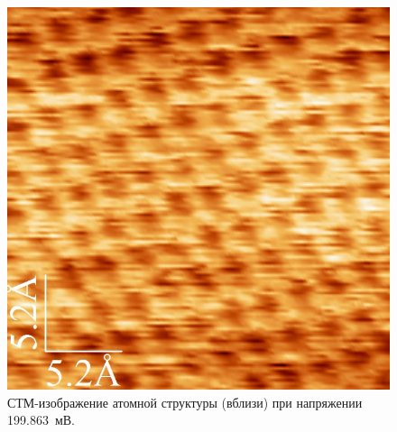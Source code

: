 \documentclass[a4paper, 12pt]{article}
\begin{document}
	\begin{figure}[H]
		\centering
		\includegraphics[width=0.6\linewidth]{2_big_atoms}
		\caption{СТМ-изображение атомной структуры (вблизи) при напряжении 199.863~мВ.}
		\label{fig:2_big_atoms}
	\end{figure}
	
\end{document}
